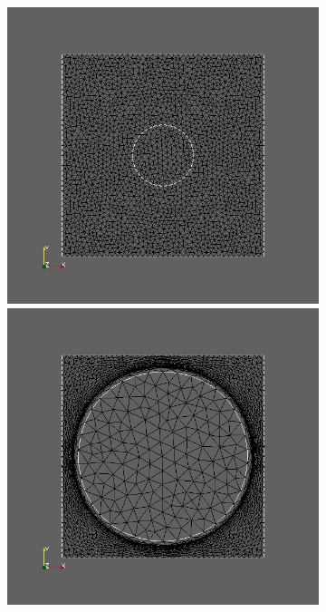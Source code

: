 \documentclass[bibliography=totoc,12pt,a4paper]{scrartcl}
\theoremstyle{exampstyle}
\numberwithin{equation}{section}
\begin{document}
\begin{figure}
	\begin{subfigure}{0.3\textwidth}
	\centering
	\includegraphics[scale=0.2]{pic_bigcircle_constlame1.jpg}
	\caption{}	
	\centering
	\includegraphics[scale=0.2]{pic_bigcircle_constlame2.jpg}

\end{subfigure}
\end{figure}
\end{document}
